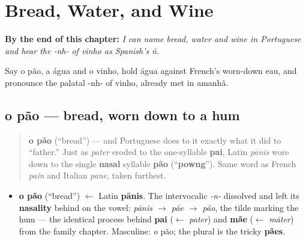 
\chapter{Bread, Water, and Wine}
\label{ch:pt-bread-water-wine}

\begin{chapteropening}
\textbf{By the end of this chapter:} \emph{I can name bread, water and wine in Portuguese and hear the -nh- of vinho as Spanish's ñ.}

Say o pão, a água and o vinho, hold água against French's worn-down eau, and pronounce the palatal -nh- of vinho, already met in amanhã.
\end{chapteropening}

\section[o pão]{o pão — bread, worn down to a hum}

\label{lesson:PT-C11-pao}



\begin{quote}
\textbf{o pão} (\textquotedblleft{}bread\textquotedblright{}) — and Portuguese does to it exactly what it did to \textquotedblleft{}father.\textquotedblright{} Just as \emph{pater} eroded to the one-syllable \textbf{pai}, Latin \emph{pānis} wore down to the single \textbf{nasal} syllable \textbf{pão} (\textquotedblleft{}\textbf{powng}\textquotedblright{}). Same word as French \emph{pain} and Italian \emph{pane}, taken furthest.
\end{quote}

\begin{cousinweb}
\begin{itemize}
\raggedright
  \item \textbf{o pão} (\textquotedblleft{}bread\textquotedblright{}) $\leftarrow$ Latin \textbf{pānis}. The intervocalic \emph{-n-} dissolved and left its \textbf{nasality} behind on the vowel: \emph{pānis $\to$ pãe $\to$ pão}, the tilde marking the hum — the identical process behind \textbf{pai} ($\leftarrow$ \emph{pater}) and \textbf{mãe} ($\leftarrow$ \emph{māter}) from the family chapter. Masculine: \emph{o} pão; the plural is the tricky \textbf{pães}.
\end{itemize}
\end{cousinweb}

